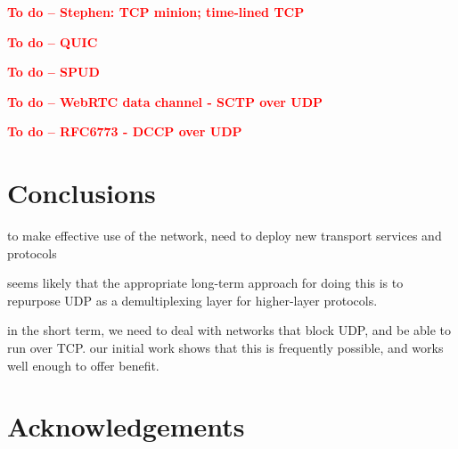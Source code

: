 \documentclass{sig-alternate-05-2015}
\newcommand{\todo}[1]{\textbf{\textcolor{red}{To do -- #1}}}
\begin{document}
\todo{Stephen: TCP minion; time-lined TCP}

\todo{QUIC}

\todo{SPUD}

\todo{WebRTC data channel - SCTP over UDP}

\todo{RFC6773 - DCCP over UDP}


\section{Conclusions}
\label{sec:conclusions}

to make effective use of the network, need to deploy new transport services
and protocols

seems likely that the appropriate long-term approach for doing this is to
repurpose UDP as a demultiplexing layer for higher-layer protocols. 

in the short term, we need to deal with networks that block UDP, and be
able to run over TCP.
our initial work shows that this is frequently possible, and works well
enough to offer benefit.

\section{Acknowledgements}




\end{document}
